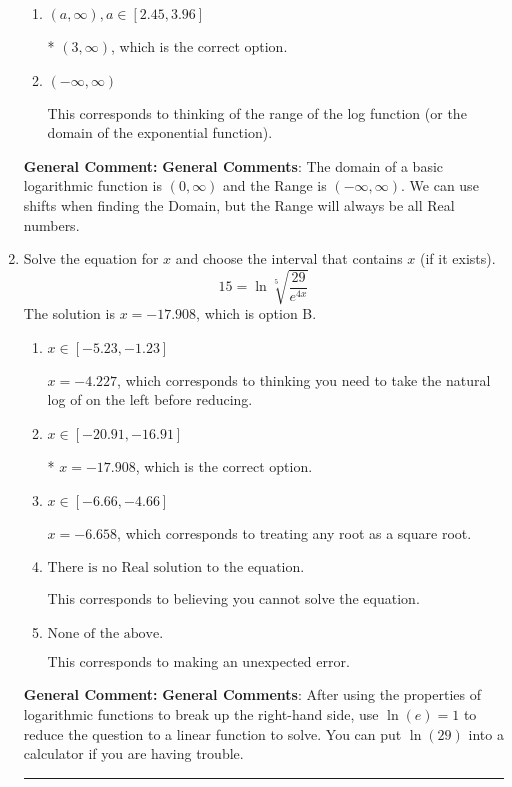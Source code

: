 \documentclass{extbook}[14pt]
\newcommand{\litem}[1]{\item #1

\rule{\textwidth}{0.4pt}}
\begin{document}
\begin{enumerate}
{\begin{enumerate}[label=\Alph*.]
$(-\infty, -3)$, which corresponds to flipping the Domain. Remember: the general for is $a*\log(x-h)+k$, \textbf{where $a$ does not affect the domain}.
\item \( (a, \infty), a \in [2.45, 3.96] \)

* $(3, \infty)$, which is the correct option.
\item \( (-\infty, \infty) \)

This corresponds to thinking of the range of the log function (or the domain of the exponential function).
\end{enumerate}

\textbf{General Comment:} \textbf{General Comments}: The domain of a basic logarithmic function is $(0, \infty)$ and the Range is $(-\infty, \infty)$. We can use shifts when finding the Domain, but the Range will always be all Real numbers.
}
\litem{
 Solve the equation for $x$ and choose the interval that contains $x$ (if it exists).
\[  15 = \ln{\sqrt[5]{\frac{29}{e^{4x}}}} \]The solution is \( x = -17.908 \), which is option B.\begin{enumerate}[label=\Alph*.]
\item \( x \in [-5.23, -1.23] \)

$x = -4.227$, which corresponds to thinking you need to take the natural log of on the left before reducing.
\item \( x \in [-20.91, -16.91] \)

* $x = -17.908$, which is the correct option.
\item \( x \in [-6.66, -4.66] \)

$x = -6.658$, which corresponds to treating any root as a square root.
\item \( \text{There is no Real solution to the equation.} \)

This corresponds to believing you cannot solve the equation.
\item \( \text{None of the above.} \)

This corresponds to making an unexpected error.
\end{enumerate}

\textbf{General Comment:} \textbf{General Comments}: After using the properties of logarithmic functions to break up the right-hand side, use $\ln(e) = 1$ to reduce the question to a linear function to solve. You can put $\ln(29)$ into a calculator if you are having trouble.
}
\end{enumerate}
\end{document}
